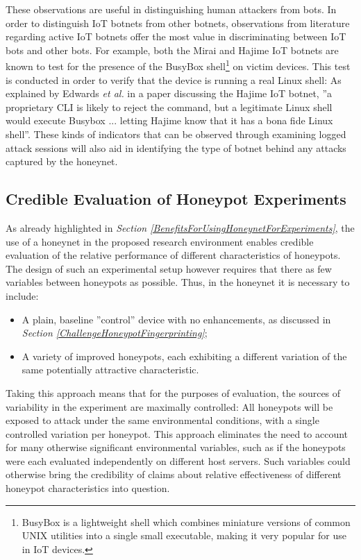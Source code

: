 These observations are useful in distinguishing human attackers from bots. In order to distinguish IoT botnets from other botnets, observations from literature regarding active IoT botnets offer the most value in discriminating between IoT bots and other bots. \cite{UnderstandingTheMiraiBotnet} \cite{HajimeMysteriousBotnet} For example, both the Mirai and Hajime IoT botnets are known to test for the presence of the BusyBox shell\footnote{BusyBox is a lightweight shell which combines miniature versions of common UNIX utilities into a single
small executable, making it very popular for use in IoT devices.} on victim devices. \cite{Busybox} This test is conducted in order to verify that the device is running a real Linux shell: As explained by Edwards \textit{et al.} in a paper discussing the Hajime IoT botnet, \cite{HajimeMysteriousBotnet} ''a proprietary CLI is likely to reject the command, but a legitimate Linux shell would execute Busybox ... letting Hajime know that it has a bona fide Linux shell''. These kinds of indicators that can be observed through examining logged attack sessions will also aid in identifying the type of botnet behind any attacks captured by the honeynet.


\subsection{Credible Evaluation of Honeypot Experiments}
As already highlighted in \textit{Section \ref{BenefitsForUsingHoneynetForExperiments}}, the use of a honeynet in the proposed research environment enables credible evaluation of the relative performance of different characteristics of honeypots. The design of such an experimental setup however requires that there as few variables between honeypots as possible. Thus, in the honeynet it is necessary to include:
\begin{itemize}
\item A plain, baseline ''control'' device with no enhancements, as discussed in \textit{Section \ref{ChallengeHoneypotFingerprinting}};
\item A variety of improved honeypots, each exhibiting a different variation of the same potentially attractive characteristic. 
\end{itemize}

Taking this approach means that for the purposes of evaluation, the sources of variability in the experiment are maximally controlled: All honeypots will be exposed to attack under the same environmental conditions, with a single controlled variation per honeypot. This approach eliminates the need to account for many otherwise significant environmental variables, such as if the honeypots were each evaluated independently on different host servers. Such variables could otherwise bring the credibility of claims about relative effectiveness of different honeypot characteristics into question.



